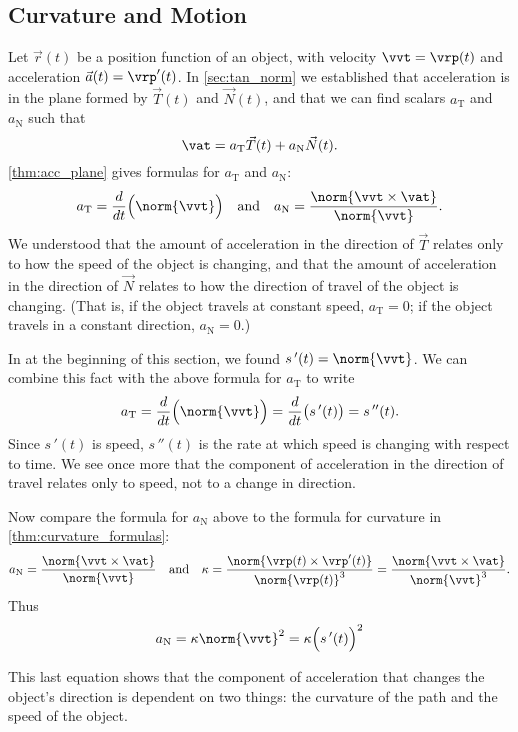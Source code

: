 \subsection{Curvature and Motion}

Let $\vec r(t)$ be a position function of an object, with velocity $\vvt = \vrp(t)$ and acceleration $\vec a(t)=\vrp'(t)$. In \autoref{sec:tan_norm} we established that acceleration is in the plane formed by $\vec T(t)$ and $\vec N(t)$, and that we can find scalars $a_\text{T}$ and $a_\text{N}$ such that 
\[\vat = a_\text{T}\vec T(t) + a_\text{N}\vec N(t).\]
\autoref{thm:acc_plane} gives formulas for $a_\text{T}$ and $a_\text{N}$:
\[a_\text{T} = \frac{d}{dt}\Big(\norm{\vvt}\Big) \quad \text{and} \quad a_\text{N} = \frac{\norm{\vvt\times \vat}}{\norm{\vvt}}.\]
We understood that the amount of acceleration in the direction of $\vec T$ relates only to how the speed of the object is changing, and that the amount of acceleration in the direction of $\vec N$ relates to how the direction of travel of the object is changing. (That is, if the object travels at constant speed, $a_\text{T}=0$; if the object travels in a constant direction, $a_\text{N}=0$.)


In  at the beginning of this section, we found
$s\,'(t) = \norm{\vvt}$. We can combine this fact with the above formula for $a_\text{T}$ to write
\[a_\text{T} = \frac{d}{dt}\Big(\norm{\vvt}\Big) = \frac{d}{dt}\big( s\,'(t)\big) = s\,''(t).\]
Since $s\,'(t)$ is speed, $s\,''(t)$ is the rate at which speed is changing with respect to time. We see once more that the component of acceleration in the direction of travel relates only to speed, not to a change in direction.

Now compare the formula for $a_\text{N}$ above to the formula for curvature in \autoref{thm:curvature_formulas}:
\[a_\text{N} = \frac{\norm{\vvt\times \vat}}{\norm{\vvt}}\quad \text{and}\quad \kappa = \frac{\norm{\vrp(t)\times\vrp'(t)}}{\norm{\vrp(t)}^3}=\frac{\norm{\vvt\times \vat}}{\norm{\vvt}^3} .\]
Thus 
\begin{equation}\label{eq:curvature_an}
a_\text{N} = \kappa \norm{\vvt}^2 = \kappa\Big(s\,'(t)\Big)^2
\end{equation}

This last equation shows that the component of acceleration that changes the object's direction is dependent on two things: the curvature of the path and the speed of the object.

